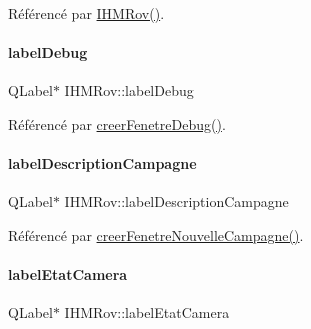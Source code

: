 Référencé par \hyperlink{class_i_h_m_rov_a5dac1fb4612866cc61f699a415e0ef6b}{I\+H\+M\+Rov()}.

\mbox{\label{class_i_h_m_rov_a667455d332d2abf2e42b897e6cc632f8}} 
\paragraph{\texorpdfstring{label\+Debug}{labelDebug}}
{\footnotesize\ttfamily Q\+Label$\ast$ I\+H\+M\+Rov\+::label\+Debug\hspace{0.3cm}{\ttfamily [private]}}



Référencé par \hyperlink{class_i_h_m_rov_a30b49bada719a73e0899ad4bafb4de99}{creer\+Fenetre\+Debug()}.

\mbox{\label{class_i_h_m_rov_addac593dfa0ea112cf4cc1b3837ca5e0}} 
\paragraph{\texorpdfstring{label\+Description\+Campagne}{labelDescriptionCampagne}}
{\footnotesize\ttfamily Q\+Label$\ast$ I\+H\+M\+Rov\+::label\+Description\+Campagne\hspace{0.3cm}{\ttfamily [private]}}



Référencé par \hyperlink{class_i_h_m_rov_a08bf623a890df272f738c1ff8631213f}{creer\+Fenetre\+Nouvelle\+Campagne()}.

\mbox{\label{class_i_h_m_rov_a2ec8f0e6175a73377e4b7e96b4f29b95}} 
\paragraph{\texorpdfstring{label\+Etat\+Camera}{labelEtatCamera}}
{\footnotesize\ttfamily Q\+Label$\ast$ I\+H\+M\+Rov\+::label\+Etat\+Camera\hspace{0.3cm}{\ttfamily [private]}}



